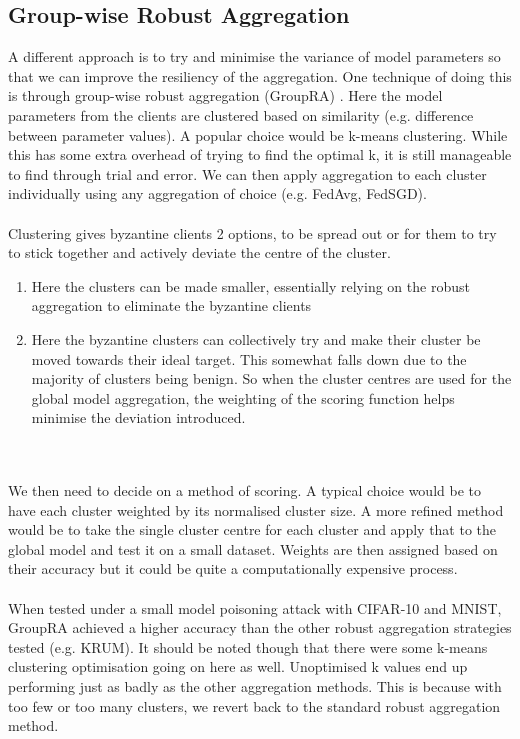 \subsection{Group-wise Robust Aggregation}
A different approach is to try and minimise the variance of model parameters so that we can improve the resiliency of the aggregation.
One technique of doing this is through group-wise robust aggregation (GroupRA) \cite{cluster_robagg}.
Here the model parameters from the clients are clustered based on similarity (e.g. difference between parameter values).
A popular choice would be k-means clustering. 
While this has some extra overhead of trying to find the optimal k, it is still manageable to find through trial and error.
We can then apply aggregation to each cluster individually using any aggregation of choice (e.g. FedAvg, FedSGD).
\\ \\
Clustering gives byzantine clients 2 options, to be spread out or for them to try to stick together and actively deviate the centre of the cluster.
\begin{enumerate}
    \item Here the clusters can be made smaller, essentially relying on the robust aggregation to eliminate the byzantine clients
    
    \item Here the byzantine clusters can collectively try and make their cluster be moved towards their ideal target.
    This somewhat falls down due to the majority of clusters being benign.
    So when the cluster centres are used for the global model aggregation, the weighting of the scoring function helps minimise the deviation introduced.
\end{enumerate}
\\ \\
We then need to decide on a method of scoring.
A typical choice would be to have each cluster weighted by its normalised cluster size.
A more refined method would be to take the single cluster centre for each cluster and apply that to the global model and test it on a small dataset.
Weights are then assigned based on their accuracy but it could be quite a computationally expensive process.
\\ \\
When tested under a small model poisoning attack with CIFAR-10 and MNIST, GroupRA achieved a higher accuracy than the other robust aggregation strategies tested (e.g. KRUM). 
It should be noted though that there were some k-means clustering optimisation going on here as well.
Unoptimised k values end up performing just as badly as the other aggregation methods.
This is because with too few or too many clusters, we revert back to the standard robust aggregation method.

